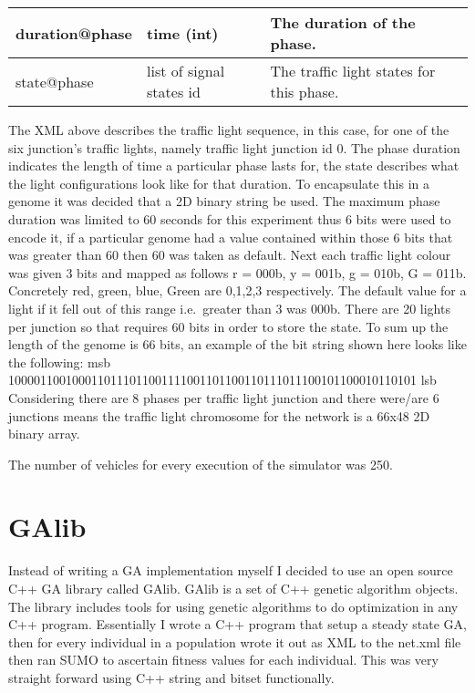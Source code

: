 \documentclass[a4paper,10pt]{article}
\begin{document}
\begin{center}
    \begin{tabular}{| l | l | p{8cm} |}
    \hline
    duration@phase & time (int) & The duration of the phase. \\ \hline
    state@phase & list of signal states id & The traffic light states for this phase. \\ \hline
    \end{tabular}
\end{center}

The XML above describes the traffic light sequence, in this case, for one of the six junction’s traffic lights, namely traffic light 
junction id 0. The phase duration indicates the length of time a particular phase lasts for, the state describes what the light 
configurations look like for that duration. To encapsulate this in a genome it was decided that a 2D binary string be used. The maximum 
phase duration was limited to 60 seconds for this experiment thus 6 bits were used to encode it, if a particular genome had a value 
contained within those 6 bits that was greater than 60 then 60 was taken as default. Next each traffic light colour was given 3 bits and 
mapped as follows r = 000b, y = 001b, g = 010b, G = 011b. Concretely red, green, blue, Green are 0,1,2,3 respectively. The default value 
for a light if it fell out of this range i.e.\ greater than 3 was 000b. There are 20 lights per junction so that requires 60 bits in order
to store the state. To sum up the length of the genome is 66 bits, an example of the bit string shown here looks like the following:
\newline
\newline
msb
1000011001000110111011001111001101100110111011100101100010110101
                                                             lsb 
\newline
\newline
Considering there are 8 phases per traffic light junction and there were/are 6 junctions means the traffic light chromosome for the 
network is a 66x48 2D binary array.

The number of vehicles for every execution of the simulator was 250.


\section{GAlib}
Instead of writing a GA implementation myself I decided to use an open source C++ GA library called GAlib. GAlib is a set of C++ genetic 
algorithm objects. The library includes tools for using genetic algorithms to do optimization in any C++ program. Essentially I wrote a 
C++ program that setup a steady state GA, then for every individual in a population wrote it out as XML to the net.xml file then ran 
SUMO to ascertain fitness values for each individual. This was very straight forward using C++ string and bitset functionally.
\end{document}
